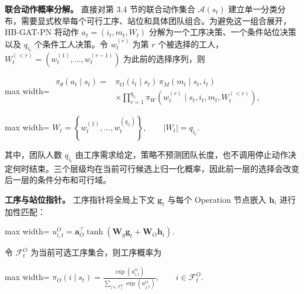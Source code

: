 \documentclass[journal,10pt]{IEEEtran}
\begin{document}
\textbf{联合动作概率分解。} 直接对第 3.4 节的联合动作集合 \(\mathcal A(s_t)\) 建立单一分类分布，需要显式枚举每个可行工序、站位和具体团队组合。为避免这一组合展开，HB-GAT-PN 将动作 \(a_t=(i_t,m_t,W_t)\) 分解为一个工序决策、一个条件站位决策以及 \(q_{i_t}\) 个条件工人决策。令 \(w_t^{(r)}\) 为第 \(r\) 个被选择的工人，\(W_t^{(<r)}=(w_t^{(1)},\ldots,w_t^{(r-1)})\) 为此前的选择序列，则

\begin{center}
\begin{adjustbox}{max width=\columnwidth}
$\displaystyle
\begin{aligned}
\pi_\theta(a_t\mid s_t)
={}&\pi_O(i_t\mid s_t)
\,\pi_M(m_t\mid s_t,i_t)\\
&\times\prod_{r=1}^{q_{i_t}}
\pi_W\!\left(
w_t^{(r)}\mid s_t,i_t,m_t,W_t^{(<r)}
\right),
\end{aligned}
$
\end{adjustbox}
\end{center}

\begin{center}
\begin{adjustbox}{max width=\columnwidth}
$\displaystyle
W_t=\left\{w_t^{(1)},\ldots,w_t^{(q_{i_t})}\right\},
\qquad |W_t|=q_{i_t}.
$
\end{adjustbox}
\end{center}

其中，团队人数 \(q_{i_t}\) 由工序需求给定，策略不预测团队长度，也不调用停止动作决定何时结束。三个层级均在当前可行候选上归一化概率，因此前一层的选择会改变后一层的条件分布和可行域。

\textbf{工序与站位指针。} 工序指针将全局上下文 \(\mathbf g_t\) 与每个 Operation 节点嵌入 \(\mathbf h_i\) 进行加性匹配：

\begin{center}
\begin{adjustbox}{max width=\columnwidth}
$\displaystyle
u_{i,t}^{O}=\mathbf a_O^{\top}
\tanh\!\left(
\mathbf W_g\mathbf g_t+\mathbf W_O\mathbf h_i
\right).
$
\end{adjustbox}
\end{center}

令 \(\mathcal F_t^O\) 为当前可选工序集合，则工序概率为

\begin{center}
\begin{adjustbox}{max width=\columnwidth}
$\displaystyle
\pi_O(i\mid s_t)=
\frac{\exp(u_{i,t}^{O})}
{\displaystyle\sum_{j\in\mathcal F_t^O}\exp(u_{j,t}^{O})},
\qquad i\in\mathcal F_t^O.
$
\end{adjustbox}
\end{center}
\end{document}
